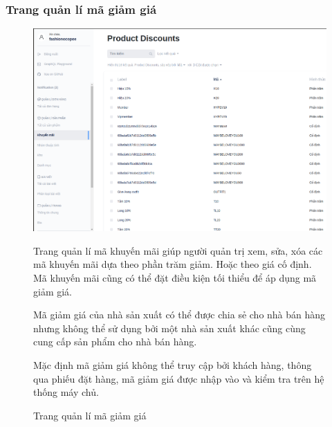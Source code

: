 \subsubsection{Trang quản lí mã giảm giá}
\FloatBarrier
\begin{figure}[!htbp]\fontsize{13px}{13px}\selectfont
\centering
		\includegraphics[width=\textwidth]{./results/discount}
		\caption{Trang quản lí mã giảm giá}
\justifying
	Trang quản lí mã khuyến mãi giúp người quản trị xem, sửa, xóa các mã khuyến mãi dựa theo phần trăm giảm. Hoặc theo giá cố định. Mã khuyến mãi cũng có thể đặt điều kiện tối thiểu để áp dụng mã giảm giá.
	
	Mã giảm giá của nhà sản xuất có thể được chia sẻ cho nhà bán hàng nhưng không thể sử dụng bởi một nhà sản xuất khác cũng cùng cung cấp sản phẩm cho nhà bán hàng.

	Mặc định mã giảm giá không thể truy cập bởi khách hàng, thông qua phiếu đặt hàng, mã giảm giá được nhập vào và kiểm tra trên hệ thống máy chủ.
\end{figure}
\clearpage
